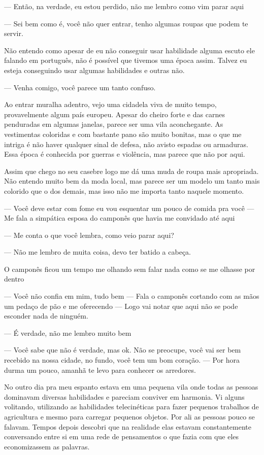 — Então, na verdade, eu estou perdido, não me lembro como vim parar aqui

— Sei bem como é, você não quer entrar, tenho algumas roupas que podem te servir.

Não entendo como apesar de eu não conseguir usar habilidade alguma escuto ele falando em português, não é possível que tivemos uma época assim. Talvez eu esteja conseguindo usar algumas habilidades e outras não.

— Venha comigo, você parece um tanto confuso.

Ao entrar muralha adentro, vejo uma cidadela viva de muito tempo, provavelmente algum país europeu. Apesar do cheiro forte e das carnes penduradas em algumas janelas, parece ser uma vila aconchegante. As vestimentas coloridas e com bastante pano são muito bonitas, mas o que me intriga é não haver qualquer sinal de defesa, não avisto espadas ou armaduras. Essa época é conhecida por guerras e violência, mas parece que não por aqui.

Assim que chego no seu casebre logo me dá uma muda de roupa mais apropriada. Não entendo muito bem da moda local, mas parece ser um modelo um tanto mais colorido que o dos demais, mas isso não me importa tanto naquele momento.

— Você deve estar com fome eu vou esquentar um pouco de comida pra você — Me fala a simpática esposa do camponês que havia me convidado até aqui

— Me conta o que você lembra, como veio parar aqui?

— Não me lembro de muita coisa, devo ter batido a cabeça.

O camponês ficou um tempo me olhando sem falar nada como se me olhasse por dentro

— Você não confia em mim, tudo bem — Fala o camponês cortando com as mãos um pedaço de pão e me oferecendo — Logo vai notar que aqui não se pode esconder nada de ninguém.

— É verdade, não me lembro muito bem

— Você sabe que não é verdade, mas ok. Não se preocupe, você vai ser bem recebido na nossa cidade, no fundo, você tem um bom coração. — Por hora durma um pouco, amanhã te levo para conhecer os arredores.

No outro dia pra meu espanto estava em uma pequena vila onde todas as pessoas dominavam diversas habilidades e pareciam conviver em harmonia. Vi alguns volitando, utilizando as habilidades telecinéticas para fazer pequenos trabalhos de agricultura e mesmo para carregar pequenos objetos. Por ali as pessoas pouco se falavam. Tempos depois descobri que na realidade elas estavam constantemente conversando entre si em uma rede de pensamentos o que fazia com que eles economizassem as palavras.


